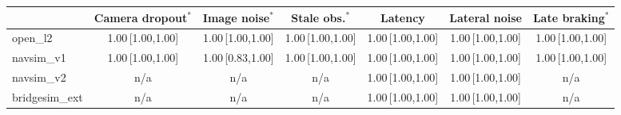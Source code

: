 \begin{tabular}{@{}lcccccc@{}}
\toprule
 & Camera dropout$^{\ast}$ & Image noise$^{\ast}$ & Stale obs.$^{\ast}$ & Latency & Lateral noise & Late braking$^{\ast}$ \\
\midrule
open\_l2 & 1.00\,{\scriptsize[1.00,1.00]} & 1.00\,{\scriptsize[1.00,1.00]} & 1.00\,{\scriptsize[1.00,1.00]} & 1.00\,{\scriptsize[1.00,1.00]} & 1.00\,{\scriptsize[1.00,1.00]} & 1.00\,{\scriptsize[1.00,1.00]} \\
navsim\_v1 & 1.00\,{\scriptsize[1.00,1.00]} & 1.00\,{\scriptsize[0.83,1.00]} & 1.00\,{\scriptsize[1.00,1.00]} & 1.00\,{\scriptsize[1.00,1.00]} & 1.00\,{\scriptsize[1.00,1.00]} & 1.00\,{\scriptsize[1.00,1.00]} \\
navsim\_v2 & n/a & n/a & n/a & 1.00\,{\scriptsize[1.00,1.00]} & 1.00\,{\scriptsize[1.00,1.00]} & n/a \\
bridgesim\_ext & n/a & n/a & n/a & 1.00\,{\scriptsize[1.00,1.00]} & 1.00\,{\scriptsize[1.00,1.00]} & n/a \\
\bottomrule
\end{tabular}

